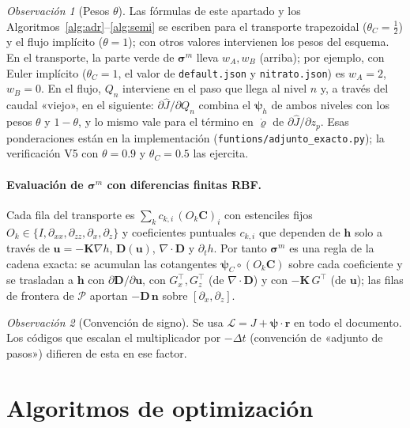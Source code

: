 \documentclass[11pt]{article}
\numberwithin{equation}{section}
\theoremstyle{plain}
\theoremstyle{definition}
\theoremstyle{remark}
\newtheorem*{remark}{Observación}
\newcommand{\bu}{\mathbf{u}}
\newcommand{\bK}{\mathbf{K}}
\newcommand{\Nuc}{\varrho}                      %
\begin{document}
\begin{remark}[Pesos $\theta$]
Las fórmulas de este apartado y los Algoritmos~\ref{alg:adr}--\ref{alg:semi} se escriben para el transporte trapezoidal ($\theta_C=\tfrac12$) y
el flujo implícito ($\theta=1$); con otros valores intervienen los pesos del esquema. En el transporte, la parte verde de
$\boldsymbol\sigma^m$ lleva $w_A,w_B$ (arriba); por ejemplo, con Euler implícito ($\theta_C=1$, el valor de
\texttt{default.json} y \texttt{nitrato.json}) es $w_A=2$, $w_B=0$. En el flujo, $Q_n$ interviene en el paso que llega al nivel $n$ y,
a través del caudal «viejo», en el siguiente: $\partial\hat J/\partial Q_n$ combina el $\boldsymbol\psi_h$ de ambos niveles con los pesos $\theta$ y
$1-\theta$, y lo mismo vale para el término en $\dot\Nuc$ de $\partial\hat J/\partial z_p$. Esas ponderaciones están en la
implementación (\texttt{funtions/adjunto\_exacto.py}); la verificación V5 con $\theta=0.9$ y $\theta_C=0.5$ las ejercita.
\end{remark}

\paragraph{Evaluación de $\boldsymbol\sigma^m$ con diferencias finitas RBF.} Cada fila del transporte es
$\sum_kc_{k,i}\,(O_k\mathbf{C})_i$ con estenciles fijos $O_k\in\{I,\partial_{xx},\partial_{zz},\partial_x,\partial_z\}$ y
coeficientes puntuales $c_{k,i}$ que dependen de $\mathbf{h}$ solo a través de $\bu=-\bK\nabla h$, $\mathbf{D}(\bu)$,
$\nabla\!\cdot\mathbf{D}$ y $\partial_th$. Por tanto $\boldsymbol\sigma^m$ es una regla de la cadena exacta: se acumulan las
cotangentes $\boldsymbol\psi_C\circ(O_k\mathbf{C})$ sobre cada coeficiente y se trasladan a $\mathbf{h}$ con
$\partial\mathbf{D}/\partial\bu$, con $G_x^\top,G_z^\top$ (de $\nabla\!\cdot\mathbf{D}$) y con $-\bK\,G^\top$ (de $\bu$); las filas de frontera
de $\mathcal{P}$ aportan $-\mathbf{D}\,\mathbf{n}$ sobre $[\partial_x,\partial_z]$.

\begin{remark}[Convención de signo]
Se usa $\mathcal{L}=J+\boldsymbol\psi\cdot\mathbf{r}$ en todo el documento. Los códigos que escalan el multiplicador
por $-\Delta t$ (convención de «adjunto de pasos») difieren de esta en ese factor.
\end{remark}

\section{Algoritmos de optimización}
\label{sec:algoritmos}
\end{document}
